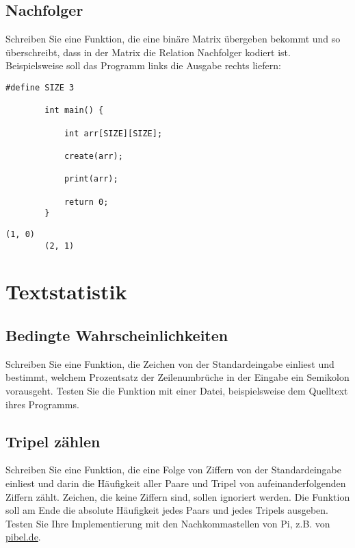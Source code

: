 \documentclass[a4paper]{article}
\begin{document}
	\subsection{Nachfolger}
	
	Schreiben Sie eine Funktion, die eine binäre Matrix übergeben bekommt und so überschreibt, dass in der Matrix die Relation Nachfolger kodiert ist.
	Beispielsweise soll das Programm links die Ausgabe rechts liefern:
	
	\noindent\begin{minipage}[t][][b]{0.6\linewidth}
	\begin{lstlisting}[gobble=4]
		#define SIZE 3
		
		int main() {
			
			int arr[SIZE][SIZE];
			
			create(arr);
			
			print(arr);
			
			return 0;
		} 
	\end{lstlisting}
	\end{minipage}\qquad
	\begin{minipage}[t][][b]{0.3\linewidth}
	\begin{lstlisting}[gobble=4]
		(1, 0)
		(2, 1)
	\end{lstlisting}
	\end{minipage}
	
	\clearpage
	
	\section{Textstatistik}
	
	\subsection{Bedingte Wahrscheinlichkeiten}
	
	Schreiben Sie eine Funktion, die Zeichen von der Standardeingabe einliest und bestimmt, welchem Prozentsatz der Zeilenumbrüche in der Eingabe ein Semikolon vorausgeht.
	Testen Sie die Funktion mit einer Datei, beispielsweise dem Quelltext ihres Programms.
	
	\subsection{Tripel zählen}
	
	Schreiben Sie eine Funktion, die eine Folge von Ziffern von der Standardeingabe einliest und darin die Häufigkeit aller Paare und Tripel von aufeinanderfolgenden Ziffern zählt.
	Zeichen, die keine Ziffern sind, sollen ignoriert werden.
	Die Funktion soll am Ende die absolute Häufigkeit jedes Paars und jedes Tripels ausgeben.
	Testen Sie Ihre Implementierung mit den Nachkommastellen von Pi, z.B. von \href{http://www.pibel.de/}{pibel.de}.
	
\end{document}
